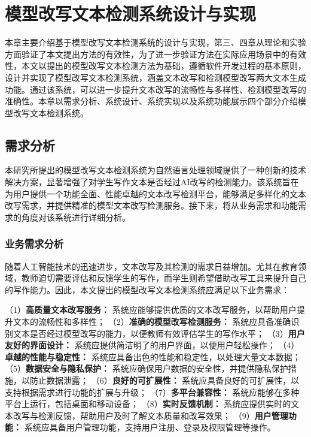 

\chapter{模型改写文本检测系统设计与实现}
\label{chap:sys}

本章主要介绍基于模型改写文本检测系统的设计与实现，第三、四章从理论和实验方面验证了本文提出方法的有效性，为了进一步验证方法在实际应用场景中的有效性，本文以提出的模型改写文本检测方法为基础，遵循软件开发过程的基本原则，设计并实现了模型改写文本检测系统，涵盖文本改写和检测模型改写两大文本生成功能。通过该系统，可以进一步提升文本改写的流畅性与多样性、检测模型改写的准确性。本章以需求分析、系统设计、系统实现以及系统功能展示四个部分介绍模型改写文本检测系统。

\section{需求分析}
\label{sec:sys-need}

本研究所提出的模型改写文本检测系统为自然语言处理领域提供了一种创新的技术解决方案，显著增强了对学生写作文本是否经过AI改写的检测能力。该系统旨在为用户提供一个功能全面、性能卓越的文本改写检测平台，能够满足多样化的文本改写需求，并提供精准的模型文本改写检测服务。接下来，将从业务需求和功能需求的角度对该系统进行详细分析。

\subsection{业务需求分析}
\label{sec:sys-bus-need}

随着人工智能技术的迅速进步，文本改写及其检测的需求日益增加。尤其在教育领域，教师迫切需要评估和反馈学生的写作，而学生则希望借助改写工具来提升自己的写作能力。因此，本文提出的模型改写文本检测系统应满足以下业务需求：

（1）\textbf{高质量文本改写服务：} 系统应能够提供优质的文本改写服务，以帮助用户提升文本的流畅性和多样性；
（2）\textbf{准确的模型改写检测服务：} 系统应具备准确识别文本是否经过模型改写的能力，以便教师有效评估学生的写作水平；
（3）\textbf{用户友好的界面设计：} 系统应提供简洁明了的用户界面，以便用户轻松操作；
（4）\textbf{卓越的性能与稳定性：} 系统应具备出色的性能和稳定性，以处理大量文本数据；
（5）\textbf{数据安全与隐私保护：} 系统应确保用户数据的安全性，并提供隐私保护措施，以防止数据泄露；
（6）\textbf{良好的可扩展性：} 系统应具备良好的可扩展性，以支持根据需求进行功能的扩展与升级；
（7）\textbf{多平台兼容性：} 系统应能够在多种平台上运行，包括桌面和移动设备；
（8）\textbf{实时反馈机制：} 系统应提供实时的文本改写与检测反馈，帮助用户及时了解文本质量和改写效果；
（9）\textbf{用户管理功能：} 系统应具备用户管理功能，支持用户注册、登录及权限管理等操作。

